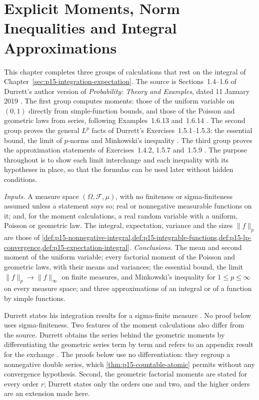 \chapter{Explicit Moments, Norm Inequalities and Integral Approximations}
\label{sec:p15-w02b-p15-001-poisson-geometric}

This chapter completes three groups of calculations that rest on the
integral of Chapter~\ref{sec:p15-integration-expectation}. The source
is Sections~1.4--1.6 of Durrett's author version of
\emph{Probability: Theory and Examples}, dated 11 January 2019
\cite[pp.~18--37]{DurrettPTEAuthor2019}. The first group computes
moments: those of the uniform variable on \((0,1)\) directly from
simple-function bounds, and those of the Poisson and geometric laws
from series, following Examples~1.6.13 and~1.6.14
\cite[pp.~34--35]{DurrettPTEAuthor2019}. The second group proves the
general \(L^p\) facts of Durrett's Exercises~1.5.1--1.5.3: the
essential bound, the limit of \(p\)-norms and Minkowski's inequality
\cite[p.~28]{DurrettPTEAuthor2019}. The third group proves the
approximation statements of Exercises~1.4.2, 1.5.7 and~1.5.9
\cite[pp.~24, 28]{DurrettPTEAuthor2019}. The purpose throughout is to
show each limit interchange and each inequality with its hypotheses
in place, so that the formulas can be used later without hidden
conditions.

\emph{Inputs.} A measure space \((\Omega,\mathcal F,\mu)\), with no
finiteness or sigma-finiteness assumed unless a statement says so; real
or nonnegative measurable functions on it; and, for the moment
calculations, a real random variable with a uniform, Poisson or
geometric law. The integral, expectation, variance and the sizes
\(\|f\|_p\) are those of
\cref{def:p15-nonnegative-integral,def:p15-integrable-functions,def:p15-lp-convergence,def:p15-expectation-integral}.
\emph{Conclusions.} The mean and second moment of the uniform variable;
every factorial moment of the Poisson and geometric laws, with their
means and variances; the essential bound, the limit
\(\|f\|_p\to\|f\|_\infty\) on finite measures, and Minkowski's
inequality for \(1\leq p\leq\infty\) on every measure space; and three
approximations of an integral or of a function by simple functions.

Durrett states his integration results for a sigma-finite measure
\cite[p.~18]{DurrettPTEAuthor2019}. No proof below uses
sigma-finiteness. Two features of the moment calculations also differ
from the source. Durrett obtains the series behind the geometric moments
by differentiating the geometric series term by term and refers to an
appendix result for the exchange
\cite[Example~A.5.6, pp.~472--473]{DurrettPTEAuthor2019}. The proofs
below use no differentiation: they regroup a nonnegative double series,
which \cref{thm:p15-countable-atomic} permits without any convergence
hypothesis. Second, the geometric factorial moments are stated for every
order \(r\); Durrett states only the orders one and two, and the higher
orders are an extension made here.

